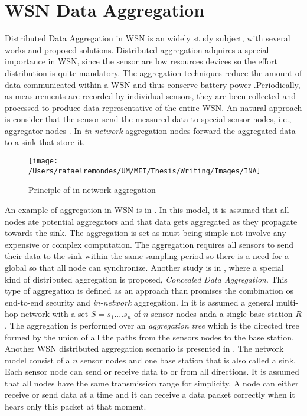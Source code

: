 \section{WSN Data Aggregation}
Distributed Data Aggregation in WSN is an widely study subject, with several works and proposed solutions. Distributed aggregation adquires a special importance in WSN, since the sensor are low resources devices so the effort distribution is quite mandatory. The aggregation techniques reduce the amount of data communicated within a WSN and thus conserve battery power \cite{castelluccia2005efficient}.Periodically, as measurements are recorded by individual sensors, they are been collected and processed to produce data representative of the entire WSN.  An natural approach is consider that the sensor send the measured data to special sensor nodes, i.e., aggregator nodes \cite{castelluccia2005efficient}. In \textit{in-network} aggregation nodes forward the aggregated data to a sink that store it.\\
\begin{figure}[h]
\centering
\texttt{[image: /Users/rafaelremondes/UM/MEI/Thesis/Writing/Images/INA]}
\caption{\label{fig:INAaggregation} Principle of in-network aggregation}
\end{figure}
An example of  aggregation in WSN is in  \cite{castelluccia2005efficient}. In this model, it is assumed that all nodes ate potential aggregators and that data gets aggregated as they propagate towards the sink. The aggregation is set as must being simple not involve any expensive or complex computation. The aggregation requires all sensors to send their data to the sink within the same sampling period so there is a need for a global so that all node can synchronize. Another study is in \cite{Girao2004c}, where a special kind of distributed aggregation is proposed, \textit{Concealed Data Aggregation}. This type of aggregation is defined as an approach than promises the combination os end-to-end security and \textit{in-network} aggregation. In \cite{chan2006secure} it is assumed a general multi-hop network with a set $S={s_1....s_n}$ of $n$ sensor nodes anda a single base station $R$. The aggregation is performed over an \textit{aggregation tree} which is the directed tree formed by the union of all the paths from the sensors nodes to the base station. Another WSN distributed aggregation scenario is presented in \cite{yu2009distributed}. The network model consist of a $n$ sensor nodes and one base station that is also called a sink. Each sensor node can send or receive data to or from all directions. It is assumed that all nodes have the same transmission range for simplicity. A node can either receive or send data at a time and it can receive a data packet correctly when it hears only this packet at that moment.


